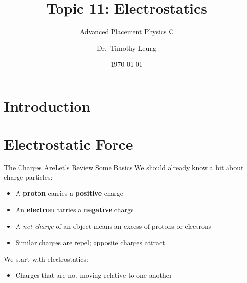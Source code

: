 \documentclass[12pt,aspectratio=169]{beamer}
\title{Topic 11: Electrostatics}
\subtitle{Advanced Placement Physics C}
\author[TML]{Dr.\ Timothy Leung}
\institute{Olympiads School, Toronto, ON, Canada}
\date{\today}
\begin{document}
\begin{frame}
  \maketitle
\end{frame}


\section[Intro]{Introduction}



\section{Electrostatic Force}

\begin{frame}{The Charges Are}{Let's Review Some Basics}
  We should already know a bit about charge particles:
  \begin{itemize}
  \item A \textbf{proton} carries a \textbf{positive} charge
  \item An \textbf{electron} carries a \textbf{negative} charge
  \item A \emph{net charge} of an object means an excess of protons or electrons
  \item Similar charges are repel; opposite charges attract
  \end{itemize}

  \vspace{.2in}We start with electrostatics:
  \begin{itemize}
  \item Charges that are not moving relative to one another
  \end{itemize}
\end{frame}
\end{document}
